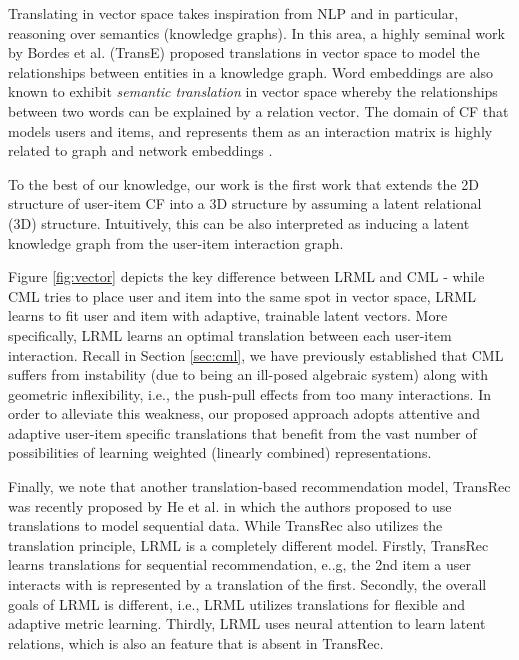 \documentclass[sigconf]{acmart}
\begin{document}
Translating in vector space takes inspiration from NLP and in particular, reasoning over semantics (knowledge graphs). In this area, a highly seminal work by Bordes et al. (TransE) \cite{DBLP:conf/nips/BordesUGWY13} proposed translations in vector space to model the relationships between entities in a knowledge graph. Word embeddings \cite{DBLP:conf/nips/MikolovSCCD13} are also known to exhibit \textit{semantic translation} in vector space whereby the relationships between two words can be explained by a relation vector. The domain of CF that models users and items, and represents them as an interaction matrix is highly related to graph and network embeddings \cite{DBLP:conf/kdd/PerozziAS14,DBLP:conf/www/TangQWZYM15,Ma:2018:MNE:3159652.3159680}. 

To the best of our knowledge, our work is the first work that extends the 2D structure of user-item CF into a 3D structure by assuming a latent relational (3D) structure. Intuitively, this can be also interpreted as inducing a latent knowledge graph from the user-item interaction graph. 

Figure \ref{fig:vector} depicts the key difference between \textsc{LRML} and CML - while CML tries to place user and item into the same spot in vector space, \textsc{LRML} learns to fit user and item with adaptive, trainable latent vectors. 
 More specifically, \textsc{LRML} learns an optimal translation between each user-item interaction. Recall in Section \ref{sec:cml}, we have previously established that CML suffers from instability (due to being an ill-posed algebraic system) along with geometric inflexibility, i.e., the push-pull effects from too many interactions. In order to alleviate this weakness, our proposed approach adopts attentive and adaptive user-item specific translations that benefit from the vast number of possibilities of learning weighted (linearly combined) representations. 


 Finally, we note that another translation-based recommendation model, TransRec was recently proposed by He et al. \cite{He:2017:TR:3109859.3109882} in which the authors proposed to use translations to model sequential data. While TransRec also utilizes the translation principle, LRML is a completely different model. Firstly, TransRec learns translations for sequential recommendation, e..g, the 2nd item a user interacts with is represented by a translation of the first. Secondly, the overall goals of LRML is different, i.e., LRML utilizes translations for flexible and adaptive metric learning. Thirdly, LRML uses neural attention to learn latent relations, which is also an feature that is absent in TransRec.
\end{document}
